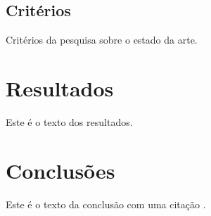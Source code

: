 \documentclass[12pt,a4paper,final]{article}
\begin{document}
\subsection{Critérios}
Critérios da pesquisa sobre o estado da arte.

\section{Resultados}
Este é o texto dos resultados.

\begin{table}[]
\centering
{}
\caption{Tabela Exemplo}
\label{tab:my-table}
\end{table}

\section{Conclusões}
Este é o texto da conclusão com uma citação \cite{su15010857}.

\newpage
\printbibliography
\end{document}
